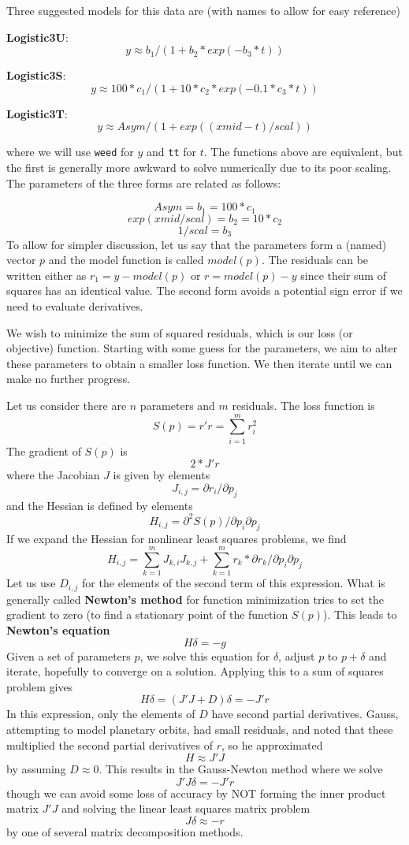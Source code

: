 \documentclass[
]{article}
\begin{document}
Three suggested models for this data are (with names to allow for easy
reference)

\textbf{Logistic3U}: \[  y \approx  b_1 / (1 + b_2 * exp(- b_3 * t)) \]

\textbf{Logistic3S}:
\[ y \approx  100 * c_1 / (1 + 10 * c_2 * exp(- 0.1 * c_3 * t)) \]

\textbf{Logistic3T}: \[ y \approx Asym / (1 + exp((xmid - t)/scal)) \]

where we will use \texttt{weed} for \(y\) and \texttt{tt} for \(t\). The
functions above are equivalent, but the first is generally more awkward
to solve numerically due to its poor scaling. The parameters of the
three forms are related as follows:

\[   Asym =  b_1 = 100 * c_1 \] \[ exp(xmid/scal)  =  b_2 = 10 * c_2 \]
\[ 1/scal  =  b_3 \] To allow for simpler discussion, let us say that
the parameters form a (named) vector \(p\) and the model function is
called \(model(p)\). The residuals can be written either as
\(r_1 = y - model(p)\) or \(r = model(p) - y\) since their sum of
squares has an identical value. The second form avoids a potential sign
error if we need to evaluate derivatives.

We wish to minimize the sum of squared residuals, which is our loss (or
objective) function. Starting with some guess for the parameters, we aim
to alter these parameters to obtain a smaller loss function. We then
iterate until we can make no further progress.

Let us consider there are \(n\) parameters and \(m\) residuals. The loss
function is \[ S(p) = r' r = \sum_{i=1}^m { r_i^2 }\] The gradient of
\(S(p)\) is \[ 2 * J' r\] where the Jacobian \(J\) is given by elements
\[ J_{i,j} = \partial r_i / \partial p_j \] and the Hessian is defined
by elements
\[ H_{i,j} = \partial ^2 S(p) / {\partial p_i \partial p_j} \] If we
expand the Hessian for nonlinear least squares problems, we find
\[  H_{i,j} = \sum_{k = 1}^m{ J_{k,i} J_{k,j}}  + \sum_{k = 1}^m {r_k * \partial{r_k}/{\partial p_i \partial p_j}}\]
Let us use \(D_{i,j}\) for the elements of the second term of this
expression. What is generally called \textbf{Newton's method} for
function minimization tries to set the gradient to zero (to find a
stationary point of the function \(S(p)\)). This leads to
\textbf{Newton's equation} \[ H \delta = -g \] Given a set of parameters
\(p\), we solve this equation for \(\delta\), adjust \(p\) to
\(p + \delta\) and iterate, hopefully to converge on a solution.
Applying this to a sum of squares problem gives
\[ H \delta = (J'J + D) \delta = - J' r\] In this expression, only the
elements of \(D\) have second partial derivatives. Gauss, attempting to
model planetary orbits, had small residuals, and noted that these
multiplied the second partial derivatives of \(r\), so he approximated
\[ H \approx J' J\] by assuming \(D \approx 0\). This results in the
Gauss-Newton method where we solve \[ J' J \delta = - J' r\] though we
can avoid some loss of accuracy by NOT forming the inner product matrix
\(J' J\) and solving the linear least squares matrix problem
\[ J \delta \approx -r \] by one of several matrix decomposition
methods.
\end{document}
